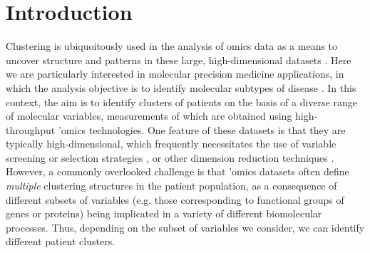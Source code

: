 \documentclass[12pt]{article}
\begin{document}
\noindent%

\section{Introduction}
\label{sec:intro}

Clustering is ubiquoitously used in the analysis of omics data as a means to uncover structure and patterns in these large, high-dimensional datasets \citep[e.g.][]{Eisen1998,Heyer:1999,Alon:1999,BenDor:1999,Son:2005}.  Here we are particularly interested in molecular precision medicine applications, in which the analysis objective is to identify molecular subtypes of disease \citep[e.g.][]{Golub1999,Perou2000,Sorlie2001,Cancer::2012,Kuijjer:2018}.  In this context, the aim is to identify clusters of patients on the basis of a diverse range of molecular variables, measurements of which are obtained using high-throughput 'omics technologies.  One feature of these datasets is that they are typically high-dimensional, which frequently necessitates the use of variable screening or selection strategies \citep[e.g.][]{Witten:2010,Fop:2018,Crook:2018}, or other dimension reduction techniques \citep[e.g.][]{Yeung:2001,McLachlan:2002,Taschler:2019}.  However, a commonly overlooked challenge is that 'omics datasets often define {\em multiple} clustering structures in the patient population, as a consequence of different subsets of variables (e.g. those corresponding to functional groups of genes or proteins) being implicated in a variety of different biomolecular processes.  Thus, depending on the subset of variables we consider, we can identify different patient clusters.  %
\end{document}
